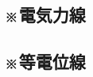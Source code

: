 \documentclass[../../ps_a.tex]{subfiles}
\begin{document}
    \vspace{1cm}
    \vfill

\subsection{※電気力線}
    

    \vspace{1cm}
    \vfill

\subsection{※等電位線}
    

    \vspace{1cm}
    \vfill
\end{document}

